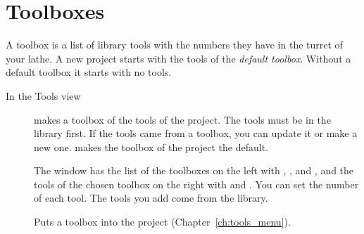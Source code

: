 \section{Toolboxes}\label{sec:tools:toolboxes}
A toolbox is a list of library tools with the numbers they have in the turret of your lathe. A new project starts with the tools of the \emph{default toolbox}. Without a default toolbox it starts with no tools.

\begin{description}
\item[In the Tools view]  makes a toolbox of the tools of the project. The tools must be in the library first. If the tools came from a toolbox, you can update it or make a new one.  makes the toolbox of the project the default.
\item[] The window has the list of the toolboxes on the left with , ,  and , and the tools of the chosen toolbox on the right with  and . You can set the number of each tool. The tools you add come from the library.
\item[] Puts a toolbox into the project (Chapter~\ref{ch:tools_menu}).
\end{description}
